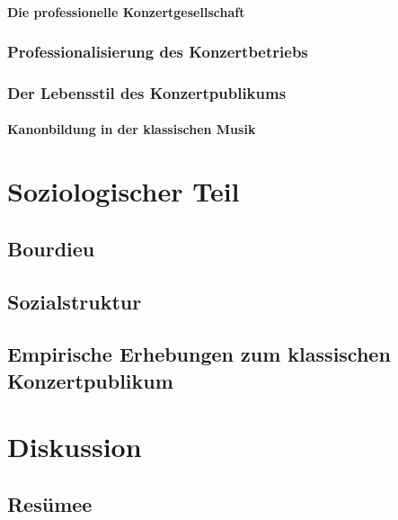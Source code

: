 \documentclass[a4paper, german, oneside]{scrbook}
\begin{document}
\subsection{Die professionelle Konzertgesellschaft}
\label{konzertgesellschaft}

\section{Professionalisierung des Konzertbetriebs}
\label{professionalisierung}
\section{Der Lebensstil des Konzertpublikums}
\label{lebensstil}


\subsection{Kanonbildung in der klassischen Musik}


\part{Soziologischer Teil}
\chapter{Bourdieu}

\chapter{Sozialstruktur}

\chapter{Empirische Erhebungen zum klassischen Konzertpublikum}

\part{Diskussion}
\chapter{Resümee}




\printbibliography
\end{document}
